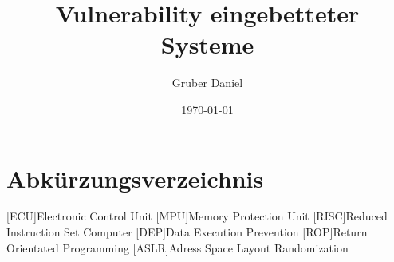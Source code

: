 \documentclass[a4paper,
DIV=13,
12pt,
BCOR=10mm,
department=FakIM,
oneside,
parskip=half,
automark,
listof=totocnumbered,
bibliography=totocnumbered,
acronym=totocnumbered
] {OTHRartcl}
\date{\today}
\title{Vulnerability eingebetteter Systeme}
\author{Gruber Daniel}
\begin{document}
\maketitle

\tableofcontents
\newpage

\section*{Abkürzungsverzeichnis}
\label{abkuerzungsverzeichnis}
\begin{acronym}[AUTOSAR]
  [ECU]{Electronic Control Unit}
  [MPU]{Memory Protection Unit}
  [RISC]{Reduced Instruction Set Computer}
  [DEP]{Data Execution Prevention}
  [ROP]{Return Orientated Programming}
  [ASLR]{Adress Space Layout Randomization}
\end{acronym}
\newpage

\end{document}
